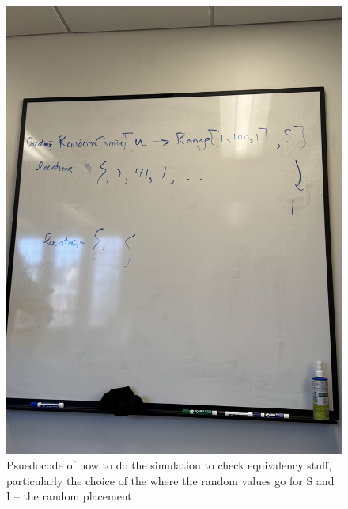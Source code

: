 \documentclass[11pt]{article}
\begin{document}
\begin{figure}[!hpt]
    \centering
    \includegraphics[width=0.65\linewidth]{man/notes-figs/20250130-pseudocode.jpg}
    \caption{Psuedocode of how to do the simulation to check equivalency stuff, particularly the choice of the where the random values go for S and I -- the random placement}
    \label{}
\end{figure}
\end{document}
